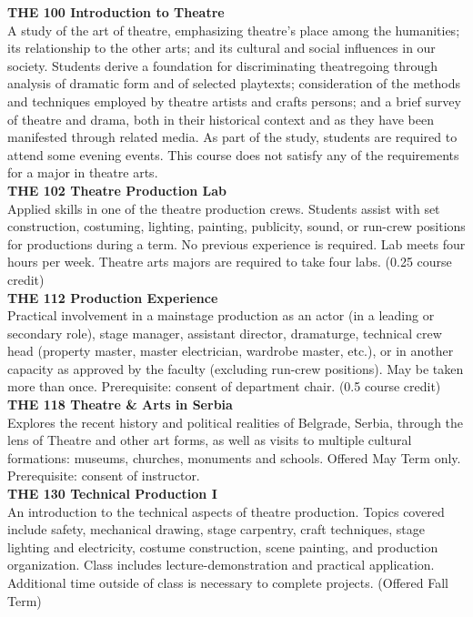 \documentclass[
  letterpaper,
]{scrbook}
\begin{document}
\textbf{THE 100 Introduction to Theatre}\\
A study of the art of theatre, emphasizing theatre's place among the
humanities; its relationship to the other arts; and its cultural and
social influences in our society. Students derive a foundation for
discriminating theatregoing through analysis of dramatic form and of
selected playtexts; consideration of the methods and techniques employed
by theatre artists and crafts persons; and a brief survey of theatre and
drama, both in their historical context and as they have been manifested
through related media. As part of the study, students are required to
attend some evening events. This course does not satisfy any of the
requirements for a major in theatre arts.\\
\textbf{THE 102 Theatre Production Lab}\\
Applied skills in one of the theatre production crews. Students assist
with set construction, costuming, lighting, painting, publicity, sound,
or run-crew positions for productions during a term. No previous
experience is required. Lab meets four hours per week. Theatre arts
majors are required to take four labs. (0.25 course credit)\\
\textbf{THE 112 Production Experience}\\
Practical involvement in a mainstage production as an actor (in a
leading or secondary role), stage manager, assistant director,
dramaturge, technical crew head (property master, master electrician,
wardrobe master, etc.), or in another capacity as approved by the
faculty (excluding run-crew positions). May be taken more than once.
Prerequisite: consent of department chair. (0.5 course credit)\\
\textbf{THE 118 Theatre \& Arts in Serbia}\\
Explores the recent history and political realities of Belgrade, Serbia,
through the lens of Theatre and other art forms, as well as visits to
multiple cultural formations: museums, churches, monuments and schools.
Offered May Term only. Prerequisite: consent of instructor.\\
\textbf{THE 130 Technical Production I}\\
An introduction to the technical aspects of theatre production. Topics
covered include safety, mechanical drawing, stage carpentry, craft
techniques, stage lighting and electricity, costume construction, scene
painting, and production organization. Class includes
lecture-demonstration and practical application. Additional time outside
of class is necessary to complete projects. (Offered Fall Term)\\
\end{document}

